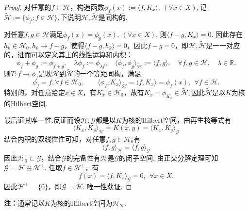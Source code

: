 \documentclass[../master.tex]{subfiles}
\begin{document}
\begin{proof}
    对任意的$f\in\mathcal{H}$，构造函数$\phi_f(x):=\langle f,K_x\rangle,~(\forall x\in X),$记$\widetilde{\mathcal{H}}:=\{\phi_f:f\in\mathcal{H}\},$下说明$\mathcal{H},\widetilde{\mathcal{H}}$是同构的. 
    
    对任意$f,g\in\mathcal{H}$满足$\phi_f(x)=\phi_g(x),~(\forall x\in X)$, 则$\langle f-g,K_x\rangle=0$. 因此存在$h_k\in\mathcal{H}_0,h_k\to f-g$，使得$\langle f-g,  h_k\rangle=0$，因此$f-g=0$，即$\mathcal{H},\widetilde{\mathcal{H}}$是一一对应的，进而可以定义其上的线性运算和内积：
    \begin{equation*}
        \phi_{f}+\phi_{g}:=\phi_{f+g},\quad\lambda\phi_{f}:=\phi_{\lambda f},\quad\langle\phi_{f},\phi_{g}\rangle_{\widetilde{\mathcal{H}}}:=\langle f,g\rangle,\quad\forall f,g\in \mathcal{H},\quad\lambda\in\mathbb{R}.
    \end{equation*}
    则$T:f\to\phi_f$是映$\mathcal{H}$到$\widetilde{\mathcal{H}}$的一个等距同构，满足
    \begin{equation*}
        \phi_{f}=f,\forall f\in \mathcal{H}_{0},\quad\quad\langle\phi_{f},K_x\rangle_{\widetilde{\mathcal{H}}}=\langle f,K_x\rangle=\phi_{f}(x),~~\forall f\in \mathcal{H}.
    \end{equation*}
特别的，对任意给定$x\in X$，有$K_x\in\mathcal{H}_0$，故有$K_x = \phi_{K_x}\in\widetilde{\mathcal{H}},$因此$\widetilde{\mathcal{H}}$是以$K$为核的Hilbert空间.

最后证其唯一性.反证而设$\mathcal{H},\mathcal{G}$都是以$K$为核的Hilbert空间，由再生核等式有
\begin{equation*}
    \langle K_x,K_y\rangle_{\mathcal{H}}=K(x,y)=\langle K_x,K_y\rangle_{\mathcal{G}}
\end{equation*}
结合内积的双线性性可知，对任意$f,g\in \mathcal{H}_0$有
\begin{equation*}
    \langle f,g\rangle_{\mathcal{H}}=\langle f,g\rangle_{\mathcal{G}}
\end{equation*}
因此$\mathcal{H}_0\subset \mathcal{G}$，结合$\mathcal{G}$的完备性有$\mathcal{H}$是$\mathcal{G}$的闭子空间. 由正交分解定理可知$\mathcal{G}=\mathcal{H}\oplus\mathcal{H}^{\perp}$. 任取$f\in\mathcal{H}^\perp$，有
\begin{equation*}
    f(x)=\langle f,K_x\rangle_{\mathcal{G}}=0,~~\forall x\in X.
\end{equation*}
因此$\mathcal{H}^{\perp}=\{0\}$，即$\mathcal{G}=\mathcal{H}$. 唯一性获证.
\end{proof}

\textbf{注：}通常记以$K$为核的Hilbert空间为$\mathcal{H_K}$.
\end{document}
